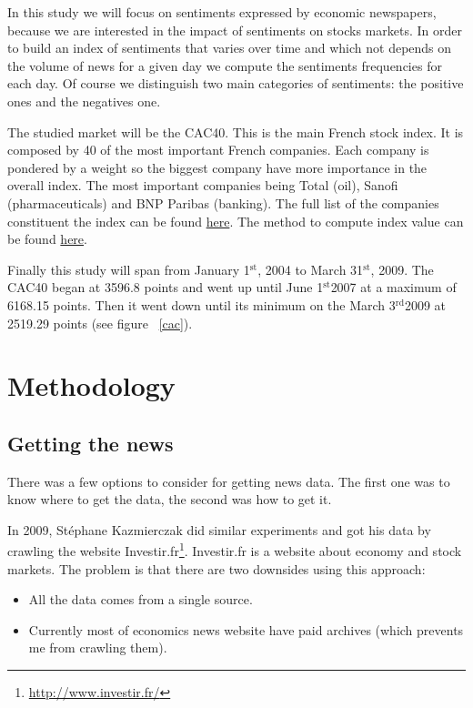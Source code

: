 \documentclass[12pt]{report}
\newcommand{\superscript}[1]{\ensuremath{^{\textrm{#1}}}}
\newcommand{\st}[0]{\superscript{st}}
\newcommand{\rd}[0]{\superscript{rd}}
\begin{document}
		In this study we will focus on sentiments expressed by economic newspapers, because we are interested in the impact of sentiments on stocks markets. In order to build an index of sentiments that varies over time and which not depends on the volume of news for a given day we compute the sentiments frequencies for each day. Of course we distinguish two main categories of sentiments: the positive ones and the negatives one.

		The studied market will be the CAC40. This is the main French stock index. It is composed by 40 of the most important French companies. Each company is pondered by a weight so the biggest company have more importance in the overall index. The most important companies being Total (oil), Sanofi (pharmaceuticals) and BNP Paribas (banking). The full list of the companies constituent the index can be found \href{http://en.wikipedia.org/wiki/CAC40}{here}. The method to compute index value can be found \href{http://www.euronext.com/fic/000/050/871/508718.pdf}{here}.

		Finally this study will span from January 1\st, 2004 to March 31\st, 2009. The CAC40 began at 3596.8 points and went up until June 1\st 2007 at a maximum of 6168.15 points. Then it went down until its minimum on the March 3\rd 2009 at 2519.29 points (see figure ~\ref{cac}).

	\chapter{Methodology}
		\section{Getting the news}

			There was a few options to consider for getting news data. The first one was to know where to get the data, the second was how to get it.

			In 2009, Stéphane Kazmierczak \cite{kazmierczak08} did similar experiments and got his data by crawling the website Investir.fr\footnote{\url{http://www.investir.fr/}}. Investir.fr is a website about economy and stock markets. The problem is that there are two downsides using this approach:
			\begin{itemize}
				\item All the data comes from a single source.
				\item Currently most of economics news website have paid archives (which prevents me from crawling them).
			\end{itemize}
\end{document}
